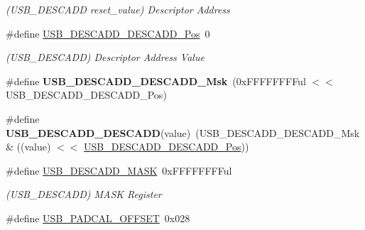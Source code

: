 \begin{DoxyCompactItemize}
\begin{DoxyCompactList}\small\item\em (U\+S\+B\+\_\+\+D\+E\+S\+C\+A\+D\+D reset\+\_\+value) Descriptor Address \end{DoxyCompactList}\item 
\hypertarget{group___s_a_m_l21___u_s_b_ga1e22175ea63ec08b9d342c89616bd45c}{}\#define \hyperlink{group___s_a_m_l21___u_s_b_ga1e22175ea63ec08b9d342c89616bd45c}{U\+S\+B\+\_\+\+D\+E\+S\+C\+A\+D\+D\+\_\+\+D\+E\+S\+C\+A\+D\+D\+\_\+\+Pos}~0\label{group___s_a_m_l21___u_s_b_ga1e22175ea63ec08b9d342c89616bd45c}

\begin{DoxyCompactList}\small\item\em (U\+S\+B\+\_\+\+D\+E\+S\+C\+A\+D\+D) Descriptor Address Value \end{DoxyCompactList}\item 
\hypertarget{group___s_a_m_l21___u_s_b_ga4285810bf01981deb0e90db095feea9d}{}\#define {\bfseries U\+S\+B\+\_\+\+D\+E\+S\+C\+A\+D\+D\+\_\+\+D\+E\+S\+C\+A\+D\+D\+\_\+\+Msk}~(0x\+F\+F\+F\+F\+F\+F\+F\+Ful $<$$<$ U\+S\+B\+\_\+\+D\+E\+S\+C\+A\+D\+D\+\_\+\+D\+E\+S\+C\+A\+D\+D\+\_\+\+Pos)\label{group___s_a_m_l21___u_s_b_ga4285810bf01981deb0e90db095feea9d}

\item 
\hypertarget{group___s_a_m_l21___u_s_b_gab1eb7eb8372f60ae1fc51cd8aa2b79d2}{}\#define {\bfseries U\+S\+B\+\_\+\+D\+E\+S\+C\+A\+D\+D\+\_\+\+D\+E\+S\+C\+A\+D\+D}(value)~(U\+S\+B\+\_\+\+D\+E\+S\+C\+A\+D\+D\+\_\+\+D\+E\+S\+C\+A\+D\+D\+\_\+\+Msk \& ((value) $<$$<$ \hyperlink{group___s_a_m_l21___u_s_b_ga1e22175ea63ec08b9d342c89616bd45c}{U\+S\+B\+\_\+\+D\+E\+S\+C\+A\+D\+D\+\_\+\+D\+E\+S\+C\+A\+D\+D\+\_\+\+Pos}))\label{group___s_a_m_l21___u_s_b_gab1eb7eb8372f60ae1fc51cd8aa2b79d2}

\item 
\hypertarget{group___s_a_m_l21___u_s_b_ga0e43ff3fa7ea7f6f84e11dbfb959cbb5}{}\#define \hyperlink{group___s_a_m_l21___u_s_b_ga0e43ff3fa7ea7f6f84e11dbfb959cbb5}{U\+S\+B\+\_\+\+D\+E\+S\+C\+A\+D\+D\+\_\+\+M\+A\+S\+K}~0x\+F\+F\+F\+F\+F\+F\+F\+Ful\label{group___s_a_m_l21___u_s_b_ga0e43ff3fa7ea7f6f84e11dbfb959cbb5}

\begin{DoxyCompactList}\small\item\em (U\+S\+B\+\_\+\+D\+E\+S\+C\+A\+D\+D) M\+A\+S\+K Register \end{DoxyCompactList}\item 
\hypertarget{group___s_a_m_l21___u_s_b_ga1c0508048b08ee324d6564adaf1a6b57}{}\#define \hyperlink{group___s_a_m_l21___u_s_b_ga1c0508048b08ee324d6564adaf1a6b57}{U\+S\+B\+\_\+\+P\+A\+D\+C\+A\+L\+\_\+\+O\+F\+F\+S\+E\+T}~0x028\label{group___s_a_m_l21___u_s_b_ga1c0508048b08ee324d6564adaf1a6b57}


\end{DoxyCompactItemize}
